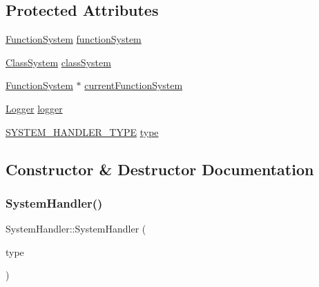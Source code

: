 \subsection*{Protected Attributes}
\begin{DoxyCompactItemize}
\item 
\hyperlink{classFunctionSystem}{Function\+System} \hyperlink{classSystemHandler_a4fc7e5a07ff162d154c7623932094a18}{function\+System}
\item 
\hyperlink{classClassSystem}{Class\+System} \hyperlink{classSystemHandler_ace6de39b5621a138654577c93f3ce9aa}{class\+System}
\item 
\hyperlink{classFunctionSystem}{Function\+System} $\ast$ \hyperlink{classSystemHandler_a5d29f688a621b074c2630470c31e6784}{current\+Function\+System}
\item 
\hyperlink{classLogger}{Logger} \hyperlink{classSystemHandler_aff3c17bc71f072c415a793a6114a5e68}{logger}
\item 
\hyperlink{statics_8h_a28f867553077bc713fdf8921a9226e2e}{S\+Y\+S\+T\+E\+M\+\_\+\+H\+A\+N\+D\+L\+E\+R\+\_\+\+T\+Y\+PE} \hyperlink{classSystemHandler_a8ca6090af683e8555051681fd31cd865}{type}
\end{DoxyCompactItemize}


\subsection{Constructor \& Destructor Documentation}
\mbox{\label{classSystemHandler_ae137763b37da96d62288adddba15aae7}} 
\subsubsection{\texorpdfstring{System\+Handler()}{SystemHandler()}}
{\footnotesize\ttfamily System\+Handler\+::\+System\+Handler (\begin{DoxyParamCaption}\item[{\hyperlink{statics_8h_a28f867553077bc713fdf8921a9226e2e}{S\+Y\+S\+T\+E\+M\+\_\+\+H\+A\+N\+D\+L\+E\+R\+\_\+\+T\+Y\+PE}}]{type }\end{DoxyParamCaption})}

\mbox{\label{classSystemHandler_afd4662824fbf97d8feb248c346968102}} 
